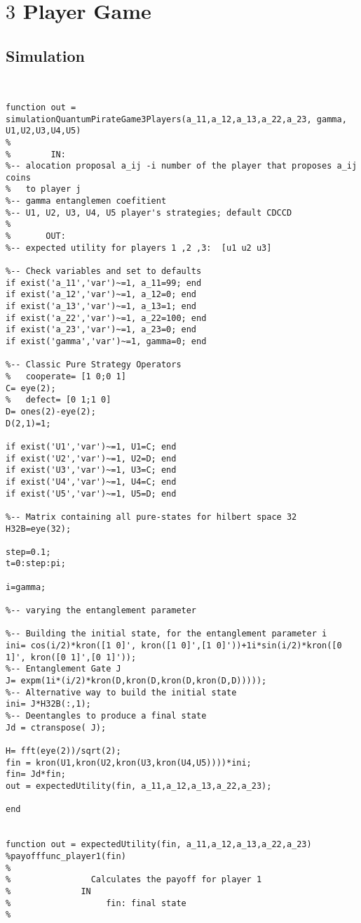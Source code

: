 \section{$3$ Player Game}

\subsection{Simulation}
\begin{lstlisting}


function out = simulationQuantumPirateGame3Players(a_11,a_12,a_13,a_22,a_23, gamma, U1,U2,U3,U4,U5)
%
%        IN:
%-- alocation proposal a_ij -i number of the player that proposes a_ij coins
%   to player j
%-- gamma entanglemen coefitient
%-- U1, U2, U3, U4, U5 player's strategies; default CDCCD
%
%       OUT:
%-- expected utility for players 1 ,2 ,3:  [u1 u2 u3]

%-- Check variables and set to defaults
if exist('a_11','var')~=1, a_11=99; end
if exist('a_12','var')~=1, a_12=0; end
if exist('a_13','var')~=1, a_13=1; end
if exist('a_22','var')~=1, a_22=100; end
if exist('a_23','var')~=1, a_23=0; end
if exist('gamma','var')~=1, gamma=0; end

%-- Classic Pure Strategy Operators
%   cooperate= [1 0;0 1]
C= eye(2);
%   defect= [0 1;1 0]
D= ones(2)-eye(2);
D(2,1)=1;

if exist('U1','var')~=1, U1=C; end
if exist('U2','var')~=1, U2=D; end
if exist('U3','var')~=1, U3=C; end
if exist('U4','var')~=1, U4=C; end
if exist('U5','var')~=1, U5=D; end

%-- Matrix containing all pure-states for hilbert space 32
H32B=eye(32);

step=0.1;
t=0:step:pi;

i=gamma;

%-- varying the entanglement parameter

%-- Building the initial state, for the entanglement parameter i
ini= cos(i/2)*kron([1 0]', kron([1 0]',[1 0]'))+1i*sin(i/2)*kron([0 1]', kron([0 1]',[0 1]'));
%-- Entanglement Gate J
J= expm(1i*(i/2)*kron(D,kron(D,kron(D,kron(D,D)))));
%-- Alternative way to build the initial state
ini= J*H32B(:,1);
%-- Deentangles to produce a final state
Jd = ctranspose( J);

H= fft(eye(2))/sqrt(2);
fin = kron(U1,kron(U2,kron(U3,kron(U4,U5))))*ini;
fin= Jd*fin;
out = expectedUtility(fin, a_11,a_12,a_13,a_22,a_23);

end


function out = expectedUtility(fin, a_11,a_12,a_13,a_22,a_23)
%payofffunc_player1(fin)
%
%                Calculates the payoff for player 1
%              IN
%                   fin: final state
%


\end{lstlisting}
